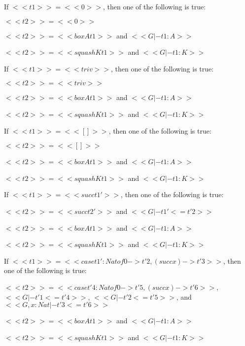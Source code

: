 \begin{lemma}
\begin{enumR}
  \item If $<<t1>> = <<0>>$, then one of the following is true:
    \begin{enumA}
    \item $<<t2>> = <<0>>$
    \item $<<t2>> = <<box A t1>>$ and $<<G |- t1 : A>>$
    \item $<<t2>> = <<squash K t1>>$ and $<<G |- t1 : K>>$
    \end{enumA}

  \item If $<<t1>> = <<triv>>$, then one of the following is true:
    \begin{enumA}
    \item $<<t2>> = <<triv>>$
    \item $<<t2>> = <<box A t1>>$ and $<<G |- t1 : A>>$
    \item $<<t2>> = <<squash K t1>>$ and $<<G |- t1 : K>>$
    \end{enumA}

  \item If $<<t1>> = <<[]>>$, then one of the following is true:
    \begin{enumA}
    \item $<<t2>> = <<[]>>$
    \item $<<t2>> = <<box A t1>>$ and $<<G |- t1 : A>>$
    \item $<<t2>> = <<squash K t1>>$ and $<<G |- t1 : K>>$
    \end{enumA}

  \item If $<<t1>> = <<succ t1'>>$, then one of the following is true:
    \begin{enumA}
    \item $<<t2>> = <<succ t2'>>$ and $<<G |- t1' <= t'2>>$
    \item $<<t2>> = <<box A t1>>$ and $<<G |- t1 : A>>$
    \item $<<t2>> = <<squash K t1>>$ and $<<G |- t1 : K>>$
    \end{enumA}

  \item If $<<t1>> = <<case t1' : Nat of 0 -> t'2, (succ x) -> t'3>>$,
    then one of the following is true:
    \begin{enumA}
    \item $<<t2>> = <<case t'4 : Nat of 0 -> t'5, (succ x) -> t'6>>$,
      $<<G |- t'1 <= t'4>>$, $<<G |- t'2 <= t'5>>$, and $<<G, x : Nat |- t'3 <= t'6>>$
    \item $<<t2>> = <<box A t1>>$ and $<<G |- t1 : A>>$
    \item $<<t2>> = <<squash K t1>>$ and $<<G |- t1 : K>>$
    \end{enumA}


\end{enumR}
\end{lemma}
